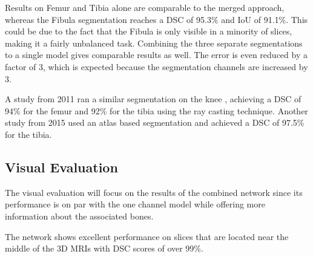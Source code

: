 Results on Femur and Tibia alone are comparable to the merged approach, whereas the Fibula segmentation reaches a DSC of 95.3\% and IoU of 91.1\%. This could be due to the fact that the Fibula is only visible in a minority of slices, making it a fairly unbalanced task. Combining the three separate segmentations to a single model gives comparable results as well. The error is even reduced by a factor of 3, which is expected because the segmentation channels are increased by 3.

A study from 2011 ran a similar segmentation on the knee \cite{Martel-Pelletier2011}, achieving a DSC of 94\% for the femur and 92\% for the tibia using the ray casting technique. Another study from 2015 \cite{Dam} used an atlas based segmentation and achieved a DSC of 97.5\% for the tibia.

\subsection{Visual Evaluation}

The visual evaluation will focus on the results of the combined network since its performance is on par with the one channel model while offering more information about the associated bones.

The network shows excellent performance on slices that are located near the middle of the 3D MRIs with DSC scores of over 99\%.

